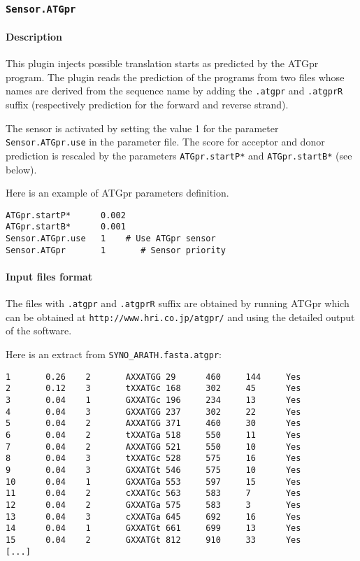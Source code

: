 
\subsubsection{\texttt{Sensor.ATGpr}}

\paragraph{Description}

This plugin injects possible translation starts as predicted by the
ATGpr program. The plugin reads the prediction of the
programs from two files whose names are derived from the sequence name
by adding the \texttt{.atgpr} and \texttt{.atgprR} suffix
(respectively prediction for the forward and reverse strand).

The sensor is activated by setting the value 1 for the parameter
\texttt{Sensor.ATGpr.use} in the parameter file. The score for acceptor
and donor prediction is rescaled by the parameters {\tt ATGpr.startP*} and
{\tt ATGpr.startB*} (see below).

Here is an example of ATGpr parameters definition.
\begin{Verbatim}[fontsize=\small]
ATGpr.startP*      0.002
ATGpr.startB*      0.001
Sensor.ATGpr.use   1    # Use ATGpr sensor
Sensor.ATGpr       1       # Sensor priority
\end{Verbatim}

\paragraph{Input files format}

The files with \texttt{.atgpr} and \texttt{.atgprR} suffix are
obtained by running ATGpr which can be obtained at
\texttt{http://www.hri.co.jp/atgpr/} and using the
detailed output of the software.

Here is an extract from \texttt{SYNO\_ARATH.fasta.atgpr}:
\begin{Verbatim}[fontsize=\small]
1       0.26    2       AXXATGG 29      460     144     Yes     
2       0.12    3       tXXATGc 168     302     45      Yes     
3       0.04    1       GXXATGc 196     234     13      Yes     
4       0.04    3       GXXATGG 237     302     22      Yes     
5       0.04    2       AXXATGG 371     460     30      Yes     
6       0.04    2       tXXATGa 518     550     11      Yes     
7       0.04    2       AXXATGG 521     550     10      Yes     
8       0.04    3       tXXATGc 528     575     16      Yes     
9       0.04    3       GXXATGt 546     575     10      Yes     
10      0.04    1       GXXATGa 553     597     15      Yes     
11      0.04    2       cXXATGc 563     583     7       Yes     
12      0.04    2       GXXATGa 575     583     3       Yes     
13      0.04    3       cXXATGa 645     692     16      Yes     
14      0.04    1       GXXATGt 661     699     13      Yes     
15      0.04    2       GXXATGt 812     910     33      Yes     
[...]
\end{Verbatim}

